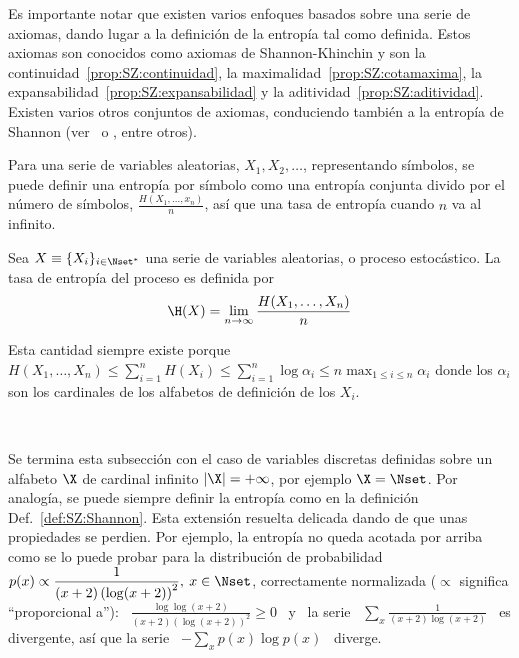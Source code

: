 Es  importante notar  que existen  varios enfoques  basados sobre  una  serie de
axiomas, dando lugar a la definici\'on de la entrop\'ia tal como definida. Estos
axiomas   son   conocidos   como   axiomas   de  Shannon-Khinchin   y   son   la
continuidad~\ref{prop:SZ:continuidad},  la maximalidad~\ref{prop:SZ:cotamaxima},
la           expansabilidad~\ref{prop:SZ:expansabilidad}           y          la
aditividad~\ref{prop:SZ:aditividad}.  Existen varios otros conjuntos de axiomas,
conduciendo  tambi\'en a  la entrop\'ia  de Shannon  (ver~\cite[Sec.~6]{Sha48} o
\cite{ShaWea64, Fad56, Fad58, Khi57, Ren61}, entre otros).

Para  una  serie de  variables  aleatorias,  $X_1,  X_2, \ldots$,  representando
s\'imbolos, se  puede definir una  entrop\'ia por s\'imbolo como  una entrop\'ia
conjunta  divido por el  n\'umero de  s\'imbolos, $\frac{H(X_1,\ldots,x_n)}{n}$,
as\'i que una tasa de entrop\'ia cuando $n$ va al infinito.
%
\begin{definicion}\label{def:SZ:TasaDeEntropia}
  Sea $X \equiv \{ X_i \}_{i  \in \Nset^*}$ una serie de variables aleatorias, o
  proceso estoc\'astico.  La tasa de entrop\'ia del proceso es definida por
  \[
  \H(X) = \lim_{n \to \infty} \frac{H(X_1,\ldots,X_n)}{n}
  \]
\end{definicion}
%
\noindent Esta  cantidad siempre existe  porque $\displaystyle H(X_1 ,  \ldots ,
X_n) \le \sum_{i=1}^n H(X_i) \le \sum_{i=1}^n  \log \alpha_i \le n \max_{1 \le i
  \le n} \alpha_i$  donde los $\alpha_i$ son los cardinales  de los alfabetos de
definici\'on de los $X_i$.

\

Se termina esta subsecci\'on con el caso de variables discretas definidas sobre
un  alfabeto $\X$ de  cardinal infinito  $|\X| =  + \infty$,  por ejemplo  $\X =
\Nset$.   Por analog\'ia,  se puede  siempre definir  la entrop\'ia  como  en la
definici\'on Def.~\ref{def:SZ:Shannon}. Esta extensi\'on resuelta delicada dando
de que unas propiedades se perdien.  Por ejemplo, la entrop\'ia no queda acotada
por arriba  como se  lo puede  probar para la  distribuci\'on de  probabilidad \
$\displaystyle p(x)  \propto \frac{1}{(x+2) \left(  \log (x+2) \right)^2},  \: x
\in \Nset$, correctamente  normalizada ($\propto$ significa ``proporcional a''):
\ $\displaystyle \frac{\log \log(x+2)}{(x+2) \left( \log (x+2) \right)^2} \ge 0$
\  y  \ la  serie  \  $\displaystyle \sum_x  \frac{1}{(x+2)  \log  (x+2)}$ \  es
divergente,  as\'i que  la serie  \ $\displaystyle  - \sum_x  p(x) \log  p(x)$ \
diverge.

